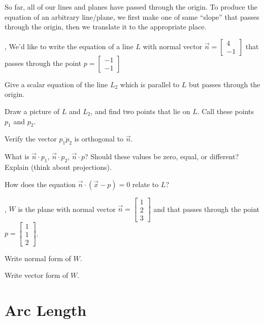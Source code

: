 \documentclass[letter]{article}
\newcommand{\mat}[1]{\begin{bmatrix}#1\end{bmatrix}}
\begin{document}
	So far, all of our lines and planes have passed through the origin. To 
	produce the equation of an arbitrary line/plane, we first make one of
	same ``slope'' that passes through the origin, then we translate it
	to the appropriate place.

	\sep
	We'd like to write the equation of a line $L$ with normal vector
	$\vec n=\begin{bmatrix}4\\-1\end{bmatrix}$ that passes through
	the point $p=\mat{-1\\-1}$

	\begin{Enum}
		\item Give a scalar equation of the line $L_2$ which is parallel to $L$
		but passes through the origin.
		\item Draw a picture of $L$ and $L_2$, and find two points that lie on
		$L$.  Call these points $p_1$ and $p_2$.
		\item Verify the vector $\overline {p_1p_2}$ is orthogonal to $\vec n$.
		\item What is $\vec n\cdot p_1$, $\vec n\cdot p_2$, $\vec n\cdot p$?
		Should these values be zero, equal, or different?  Explain (think about
		projections).
		\item How does the equation $\vec n\cdot (\vec x-p)=0$ relate to $L$?
	\end{Enum}

	\sep
	$W$ is the plane with normal vector $\vec n=\mat{1\\2\\3}$ and that passes through
	the point $p=\mat{1\\1\\2}$.
	\begin{Enum}
		\item Write normal form of $W$.
		\item Write vector form of $W$.
	\end{Enum}

\newpage

\section*{Arc Length}
\end{document}

